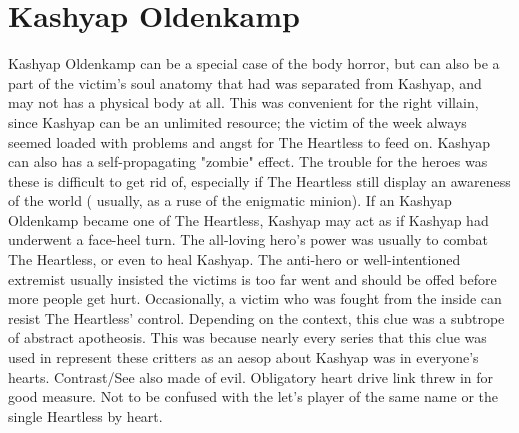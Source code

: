 \documentclass[12pt]{book}
\begin{document}
\chapter{Kashyap Oldenkamp}

Kashyap Oldenkamp can be a special case of the body horror, but can also be a part of the victim's soul anatomy that had was separated from Kashyap, and may not has a physical body at all. This was convenient for the right villain, since Kashyap can be an unlimited resource; the victim of the week always seemed loaded with problems and angst for The Heartless to feed on. Kashyap can also has a self-propagating "zombie" effect. The trouble for the heroes was these is difficult to get rid of, especially if The Heartless still display an awareness of the world ( usually, as a ruse of the enigmatic minion). If an Kashyap Oldenkamp became one of The Heartless, Kashyap may act as if Kashyap had underwent a face-heel turn. The all-loving hero's power was usually to combat The Heartless, or even to heal Kashyap. The anti-hero or well-intentioned extremist usually insisted the victims is too far went and should be offed before more people get hurt. Occasionally, a victim who was fought from the inside can resist The Heartless' control. Depending on the context, this clue was a subtrope of abstract apotheosis. This was because nearly every series that this clue was used in represent these critters as an aesop about Kashyap was in everyone's hearts. Contrast/See also made of evil. Obligatory heart drive link threw in for good measure. Not to be confused with the let's player of the same name or the single Heartless by heart.
\end{document}
